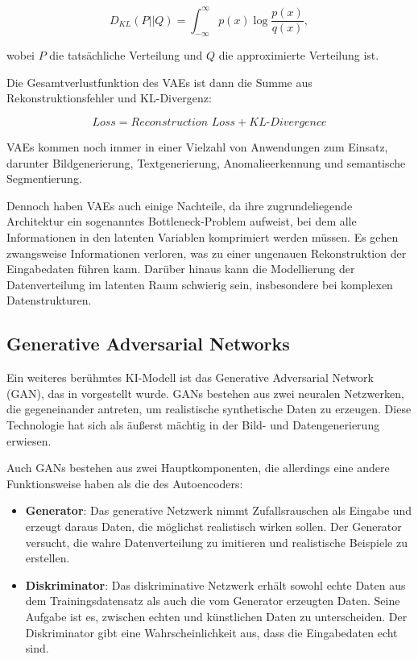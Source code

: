 \begin{equation}
	D_{KL}(P||Q) = \int_{-\infty}^{\infty} p(x) \log \frac{p(x)}{q(x)},
	\label{eq:kl-divergence}
\end{equation}

wobei $P$ die tatsächliche Verteilung und $Q$ die approximierte Verteilung ist.

Die Gesamtverlustfunktion des VAEs ist dann die Summe aus Rekonstruktionsfehler und KL-Divergenz:

\begin{equation}
	Loss = \textit{Reconstruction Loss} + \textit{KL-Divergence}
	\label{eq:loss-vae}
\end{equation}

VAEs kommen noch immer in einer Vielzahl von Anwendungen zum Einsatz, darunter Bildgenerierung, Textgenerierung, Anomalieerkennung und semantische Segmentierung. \parencite{}

Dennoch haben VAEs auch einige Nachteile, da ihre zugrundeliegende Architektur ein sogenanntes Bottleneck-Problem aufweist, bei dem alle Informationen in den latenten Variablen komprimiert werden müssen. Es gehen zwangsweise Informationen verloren, was zu einer ungenauen Rekonstruktion der Eingabedaten führen kann. Darüber hinaus kann die Modellierung der Datenverteilung im latenten Raum schwierig sein, insbesondere bei komplexen Datenstrukturen. \parencite{}

\subsection{Generative Adversarial Networks} \label{subsec:gan}

Ein weiteres berühmtes KI-Modell ist das Generative Adversarial Network (GAN), das in \parencite{Goodfellow2014gan} vorgestellt wurde. GANs bestehen aus zwei neuralen Netzwerken, die gegeneinander antreten, um realistische synthetische Daten zu erzeugen. Diese Technologie hat sich als äußerst mächtig in der Bild- und Datengenerierung erwiesen.

Auch GANs bestehen aus zwei Hauptkomponenten, die allerdings eine andere Funktionsweise haben als die des Autoencoders:

\begin{itemize}
	\item \textbf{Generator}: Das generative Netzwerk nimmt Zufallsrauschen als Eingabe und erzeugt daraus Daten, die möglichst realistisch wirken sollen. Der Generator versucht, die wahre Datenverteilung zu imitieren und realistische Beispiele zu erstellen.
	\item \textbf{Diskriminator}: Das diskriminative Netzwerk erhält sowohl echte Daten aus dem Trainingsdatensatz als auch die vom Generator erzeugten Daten. Seine Aufgabe ist es, zwischen echten und künstlichen Daten zu unterscheiden. Der Diskriminator gibt eine Wahrscheinlichkeit aus, dass die Eingabedaten echt sind.
\end{itemize}


